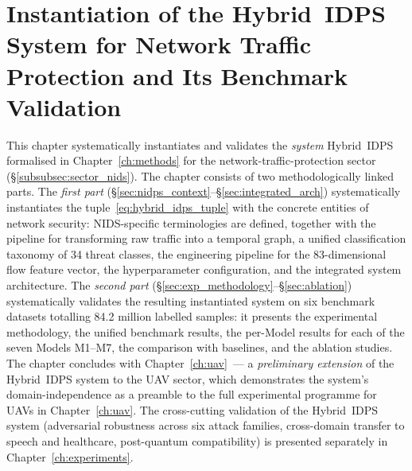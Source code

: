 
\chapter{Instantiation of the Hybrid~IDPS System for Network Traffic Protection and Its Benchmark Validation}
\label{ch:adaptation}

This chapter systematically instantiates and validates the
\emph{system} Hybrid~IDPS formalised in Chapter~\ref{ch:methods} for
the network-traffic-protection sector
(\S\ref{subsubsec:sector_nids}). The chapter consists of two
methodologically linked parts. The \emph{first part}
(\S\ref{sec:nidps_context}--\S\ref{sec:integrated_arch})
systematically instantiates the tuple~\eqref{eq:hybrid_idps_tuple}
with the concrete entities of network security: NIDS-specific
terminologies are defined, together with the pipeline for
transforming raw traffic into a temporal graph, a unified
classification taxonomy of 34 threat classes, the engineering
pipeline for the 83-dimensional flow feature vector, the
hyperparameter configuration, and the integrated system
architecture. The \emph{second part}
(\S\ref{sec:exp_methodology}--\S\ref{sec:ablation}) systematically
validates the resulting instantiated system on six benchmark
datasets totalling 84.2 million labelled samples: it presents the
experimental methodology, the unified benchmark results, the
per-Model results for each of the seven Models M1--M7, the
comparison with baselines, and the ablation studies. The chapter
concludes with Chapter~\ref{ch:uav}~--- a \emph{preliminary
extension} of the Hybrid~IDPS system to the UAV sector, which
demonstrates the system's domain-independence as a preamble to the
full experimental programme for UAVs in Chapter~\ref{ch:uav}. The
cross-cutting validation of the Hybrid~IDPS system (adversarial
robustness across six attack families, cross-domain transfer to
speech and healthcare, post-quantum compatibility) is presented
separately in Chapter~\ref{ch:experiments}.

